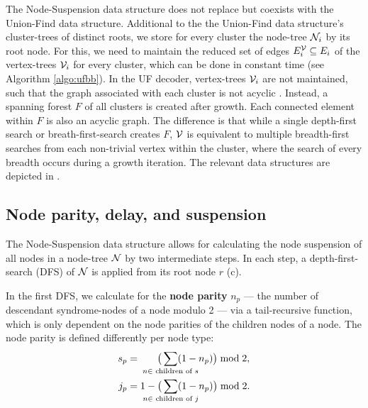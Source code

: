 The Node-Suspension data structure does not replace but coexists with the Union-Find data structure. Additional to the the Union-Find data structure's cluster-trees of distinct roots, we store for every cluster the node-tree $\mathcal{N}_i$ by its root node. For this, we need to maintain the reduced set of edges $E^{\mathcal{V}}_i \subseteq E_i$ of the vertex-trees $\mathcal{V}_i$ for every cluster, which can be done in constant time (see Algorithm \ref{algo:ufbb}). In the UF decoder, vertex-trees $\mathcal{V}_i$ are not maintained, such that the graph associated with each cluster is not acyclic \cite{delfosse2017almost}. Instead, a spanning forest $F$ of all clusters is created \cite{delfosse2017linear} after growth. Each connected element within $F$ is also an acyclic graph. The difference is that while a single depth-first search or breath-first-search creates $F$, $\mathcal{V}$ is equivalent to multiple breadth-first searches from each non-trivial vertex within the cluster, where the search of every breadth occurs during a growth iteration. The relevant data structures are depicted in . 


\subsection{Node parity, delay, and suspension}\label{sec:paritydelaysus}

The Node-Suspension data structure allows for calculating the node suspension of all nodes in a node-tree $\mathcal{N}$ by two intermediate steps. In each step, a depth-first-search (DFS) of $\mathcal{N}$ is applied from its root node $r$ (c).

In the first DFS, we calculate for the \textbf{node parity} $n_p$ --- the number of descendant syndrome-nodes of a node modulo 2 --- via a tail-recursive function, which is only dependent on the node parities of the children nodes of a node. The node parity is defined differently per node type:
\begin{align}\label{eq:nodeparity}
    s_p &= \hspace{.6cm}\big( \sum_{\mathclap{n \in \text{ children of } s}} (1-n_p) \big ) \bmod 2,\\
    j_p &= 1 - \big(\sum_{\mathclap{n \in \text{ children of } j}} (1-n_p) \big) \bmod 2.
\end{align}

